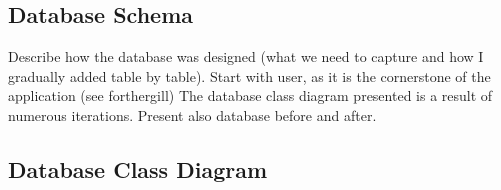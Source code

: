 \subsection{Database Schema}
Describe how the database was designed (what we need to capture and how I gradually added table by table). Start with user, as it is the cornerstone of the application (see forthergill)
The database class diagram presented is a result of numerous iterations.  
Present also database before and after.

\subsection{Database Class Diagram}

